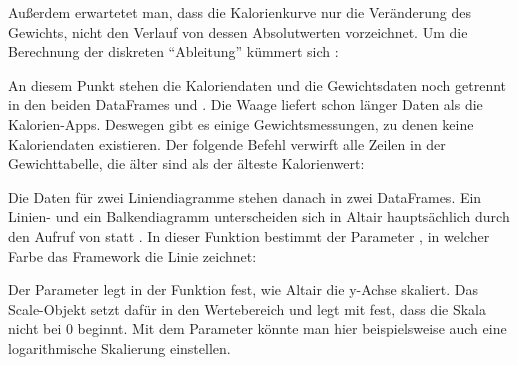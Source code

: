 \medskip

Außerdem erwartetet man, dass die Kalorienkurve nur die Veränderung des Gewichts, nicht den Verlauf von dessen Absolutwerten vorzeichnet. Um die Berechnung der diskreten ``Ableitung'' kümmert sich :


\medskip


\medskip


An diesem Punkt stehen die Kaloriendaten und die Gewichtsdaten noch getrennt in den beiden DataFrames  und . Die Waage liefert schon länger Daten als die Kalorien-Apps. Deswegen gibt es einige Gewichtsmessungen, zu denen keine Kaloriendaten existieren. Der folgende Befehl verwirft alle Zeilen in der Gewichttabelle, die älter sind als der älteste Kalorienwert:

\medskip

\PYTHON{df\_weight = df\_weight[}


\PYTHON{\qquad \qquad \qquad df\_nutri["date"][-1]]}

\medskip


Die Daten für zwei Liniendiagramme stehen danach in zwei DataFrames. Ein Linien- und ein Balkendiagramm unterscheiden sich in Altair hauptsächlich durch den Aufruf von  statt . In dieser Funktion bestimmt der Parameter , in welcher Farbe das Framework die Linie zeichnet:

\medskip








\PYTHON{)}

\medskip



Der Parameter  legt in der Funktion  fest, wie Altair die y-Achse skaliert. Das Scale-Objekt setzt dafür in  den Wertebereich und legt mit  fest, dass die Skala nicht bei 0 beginnt. Mit dem Parameter  könnte man hier beispielsweise auch eine logarithmische Skalierung einstellen.


